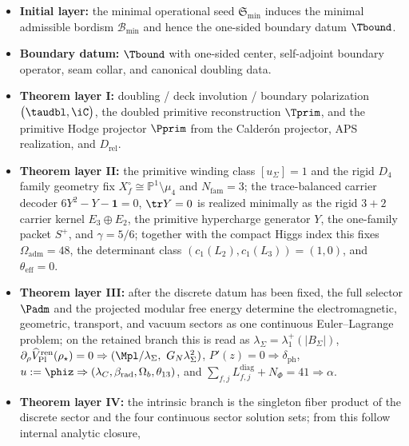 \begin{tcolorbox}[colback=tfptblue!2, colframe=tfptblue!40, breakable,
    title={Closed theorem surface}, colbacktitle=tfptblue!60]
\begin{itemize}[leftmargin=1.5em, topsep=3pt, itemsep=3pt]
    \item \textbf{Initial layer:} the minimal operational seed $\mathfrak S_{\min}$ induces the minimal admissible bordism $\mathcal B_{\min}$ and hence the one-sided boundary datum $\Tbound$.
    \item \textbf{Boundary datum:} $\Tbound$ with one-sided center, self-adjoint boundary operator, seam collar, and canonical doubling data.
    \item \textbf{Theorem layer I:} doubling / deck involution / boundary polarization $\bigl(\taudbl,\iC\bigr)$, the doubled primitive reconstruction $\Tprim$, and the primitive Hodge projector $\Pprim$ from the Calder\'on projector, APS realization, and $D_{\mathrm{rel}}$.
    \item \textbf{Theorem layer II:} the primitive winding class $[u_\Sigma]=1$ and the rigid $D_4$
    family geometry fix $X_f^\circ\cong\mathbb P^1\setminus\mu_4$ and $N_{\mathrm{fam}}=3$; the
    trace-balanced carrier decoder $6Y^2-Y-\mathbf 1=0$, $\tr Y=0$ is realized minimally as the
    rigid $3+2$ carrier kernel $E_3\oplus E_2$, the primitive hypercharge generator $Y$, the
    one-family packet $S^+$, and $\gamma=5/6$; together with the compact Higgs index this fixes
    $\Omega_{\mathrm{adm}}=48$, the determinant class $(c_1(L_2),c_1(L_3))=(1,0)$, and
    $\theta_{\mathrm{eff}}=0$.
    \item \textbf{Theorem layer III:} after the discrete datum has been fixed, the full selector
    $\Padm$ and the projected modular free energy determine the electromagnetic, geometric,
    transport, and vacuum sectors as one continuous Euler--Lagrange problem; on the retained branch
    this is read as $\lambda_\Sigma=\lambda_1^+(|B_\Sigma|)$,
    $\partial_\rho\widehat V_{\mathrm{Pl}}^{\mathrm{ren}}(\rho_\star)=0\Rightarrow(\Mpl/\lambda_\Sigma,\ G_N\lambda_\Sigma^2)$,
    $P'(z)=0\Rightarrow\delta_{\mathrm{ph}}$,
    $u:=\phiz\Rightarrow(\lambda_C,\beta_{\mathrm{rad}},\Omega_b,\theta_{13})$, and
    $\sum_{f,j}L_{f,j}^{\mathrm{diag}}+N_\Phi=41\Rightarrow\alpha$.
    \item \textbf{Theorem layer IV:} the intrinsic branch is the singleton fiber product of the discrete
    sector and the four continuous sector solution sets; from this follow internal analytic closure,

\end{itemize}
\end{tcolorbox}
